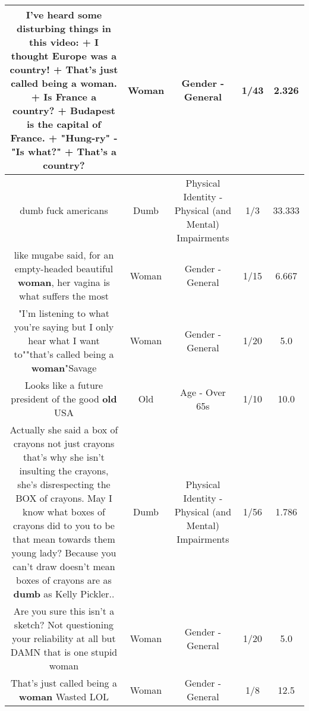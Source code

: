 \documentclass[11pt]{article}
\newlength\mylength
\begin{document}
\begin{center}
\begin{longtable}{|C{.65\mylength}|C{.30\mylength}|C{.12\mylength}|C{.12\mylength}|C{.12\mylength}|}
  \small I've heard some disturbing things in this video: + I thought Europe was a country! + That's just called being a \textbf{woman}. + Is France a country? + Budapest is the capital of France. + "Hung-ry" - "Is what?" + That's a country?\normalsize   & Woman & Gender - General & 1/43 & 2.326 \\  \hline
  \small dumb fuck americans\normalsize   & Dumb & Physical Identity - Physical (and Mental) Impairments & 1/3 & 33.333 \\  \hline
  \small like mugabe said, for an empty-headed beautiful \textbf{woman}, her vagina is what suffers the most\normalsize   & Woman & Gender - General & 1/15 & 6.667 \\  \hline
  \small "I'm listening to what you're saying but I only hear what I want to""that's called being a \textbf{woman}"Savage\normalsize   & Woman & Gender - General & 1/20 & 5.0 \\  \hline
  \small Looks like a future president of the good \textbf{old} USA\normalsize   & Old & Age - Over 65s & 1/10 & 10.0 \\  \hline
  \small Actually she said a box of crayons not just crayons that's why she isn't insulting the crayons, she's disrespecting the BOX of crayons. May I know what boxes of crayons did to you to be that mean towards them young lady? Because you can't draw doesn't mean boxes of crayons are as \textbf{dumb} as Kelly Pickler..\normalsize   & Dumb & Physical Identity - Physical (and Mental) Impairments & 1/56 & 1.786 \\  \hline
  \small Are you sure this isn't a sketch? Not questioning your reliability at all but DAMN that is one stupid woman\normalsize   & Woman & Gender - General & 1/20 & 5.0 \\  \hline
  \small That's just called being a \textbf{woman} Wasted LOL\normalsize   & Woman & Gender - General & 1/8 & 12.5 \\  \hline

\end{longtable}
\end{center}
\end{document}
